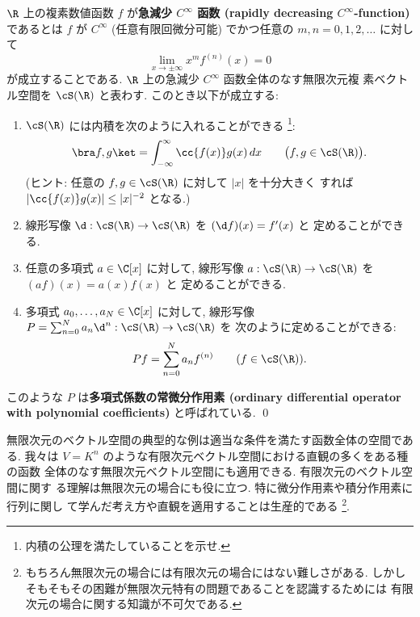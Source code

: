 \documentclass[12pt,twoside]{jarticle}
\begin{document}
\begin{question}
\label{q:rapidly-decreasing-Cinfty-function}
  $\R$ 上の複素数値函数 $f$ が{\bf 急減少 $C^\infty$ 函数 (rapidly
  decreasing $C^\infty$-function)} であるとは $f$ が $C^\infty$ 
  (任意有限回微分可能) でかつ任意の $m,n=0,1,2,\ldots$ に対して
  \begin{equation*}
    \lim_{x\to\pm\infty} x^m f^{(n)}(x) = 0
  \end{equation*}
  が成立することである.  $\R$ 上の急減少 $C^\infty$ 函数全体のなす無限次元複
  素ベクトル空間を $\cS(\R)$ と表わす.  このとき以下が成立する:
  \begin{enumerate}
  \item $\cS(\R)$ には内積を次のように入れることができる%
    \footnote{内積の公理を満たしていることを示せ.}:
    \begin{equation*}
      \bra f,g\ket = \int_{-\infty}^\infty \cc{f(x)}g(x)\,dx
      \qquad
      \bigl(f,g\in\cS(\R)\bigr).
    \end{equation*}
    (ヒント: 任意の $f,g\in\cS(\R)$ に対して $|x|$ を十分大きく
    すれば $\left|\cc{f(x)}g(x)\right|\le |x|^{-2}$ となる.)
  \item 線形写像 $\d:\cS(\R)\to\cS(\R)$ を $(\d f)(x) = f'(x)$ と
    定めることができる.
  \item 任意の多項式 $a\in\C[x]$ に対して, 
    線形写像 $a:\cS(\R)\to\cS(\R)$ を $(af)(x)=a(x)f(x)$ と
    定めることができる.
  \item 多項式 $a_0,\dots,a_N\in\C[x]$ に対して,
    線形写像 $P=\sum_{n=0}^N a_n \d^n:\cS(\R)\to\cS(\R)$ を
    次のように定めることができる: 
    \begin{equation*}
      Pf = \sum_{n=0}^N a_n f^{(n)}
      \qquad (f\in\cS(\R)).
    \end{equation*}
  \end{enumerate}
  このような $P$ は{\bf 多項式係数の常微分作用素 (ordinary differential
  operator with polynomial coefficients)} と呼ばれている. 
  \qed
\end{question}


無限次元のベクトル空間の典型的な例は適当な条件を満たす函数全体の空間である.
我々は $V=K^n$ のような有限次元ベクトル空間における直観の多くをある種の函数
全体のなす無限次元ベクトル空間にも適用できる.  有限次元のベクトル空間に関す
る理解は無限次元の場合にも役に立つ.  特に微分作用素や積分作用素に行列に関し
て学んだ考え方や直観を適用することは生産的である%
\footnote{もちろん無限次元の場合には有限次元の場合にはない難しさがある.
  しかしそもそもその困難が無限次元特有の問題であることを認識するためには
  有限次元の場合に関する知識が不可欠である.}.
\end{document}
